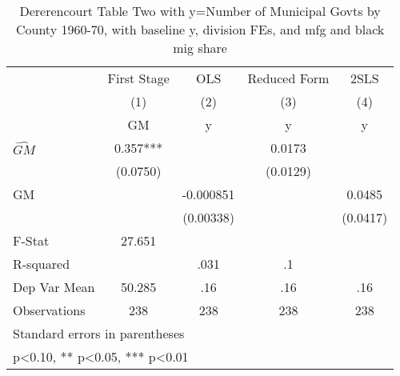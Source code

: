 \begin{table}[htbp]\centering
\def\sym#1{\ifmmode^{#1}\else\(^{#1}\)\fi}
\caption{Dererencourt Table Two with y=Number of Municipal Govts by County 1960-70, with baseline y, division FEs, and mfg and black mig share}
\begin{tabular}{l*{4}{c}}
\toprule
                    & First Stage   &         OLS   &Reduced Form   &        2SLS   \\
                    &\multicolumn{1}{c}{(1)}&\multicolumn{1}{c}{(2)}&\multicolumn{1}{c}{(3)}&\multicolumn{1}{c}{(4)}\\
                    &\multicolumn{1}{c}{GM}&\multicolumn{1}{c}{y}&\multicolumn{1}{c}{y}&\multicolumn{1}{c}{y}\\
\midrule
$\hat{GM}$          &       0.357***&               &      0.0173   &               \\
                    &    (0.0750)   &               &    (0.0129)   &               \\
\addlinespace
GM                  &               &   -0.000851   &               &      0.0485   \\
                    &               &   (0.00338)   &               &    (0.0417)   \\
\midrule
F-Stat              &      27.651   &               &               &               \\
R-squared           &               &        .031   &          .1   &               \\
Dep Var Mean        &      50.285   &         .16   &         .16   &         .16   \\
Observations        &         238   &         238   &         238   &         238   \\
\bottomrule
\multicolumn{5}{l}{\footnotesize Standard errors in parentheses}\\
\multicolumn{5}{l}{\footnotesize * p<0.10, ** p<0.05, *** p<0.01}\\
\end{tabular}
\end{table}
